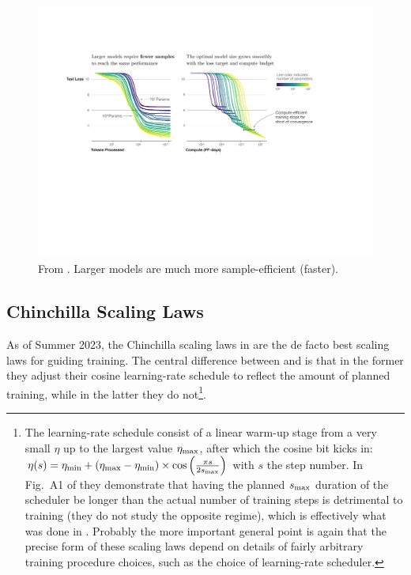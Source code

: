 \documentclass[11pt]{article}
\begin{document}
\begin{figure}[ht]
	\centering
	\includegraphics[scale=.5]{figures/EfficiencyIllustration.pdf}
	\caption{From \cite{kaplan2020scaling}. Larger models are much more sample-efficient (faster).}
	\label{fig_scaling_laws_original_2}
\end{figure}


\subsection{Chinchilla Scaling Laws}

As of Summer 2023, the Chinchilla scaling laws in \cite{hoffmann2022training} are the de facto best
scaling laws for guiding training. The central difference between \cite{hoffmann2022training} and
\cite{kaplan2020scaling} is that in the former they adjust their cosine learning-rate schedule to
reflect the amount of planned training, while in the latter they do not\footnote{The learning-rate
	schedule consist of a linear warm-up stage from a very small $ \eta  $ up to the largest value $ \eta _{ {\rm max} } $, after
	which the cosine bit kicks in: $ \eta (s)= \eta _{ {\rm min} } + \left ( \eta _{ {\rm max} } - \eta  _{ {\rm
				min} } \right ) \times \cos \left (\frac{ \pi s }{ 2 s _{ {\rm max} } }  \right) $ with $ s $ the
	step number. In Fig.~A1 of \cite{hoffmann2022training} they demonstrate that having the planned $ s
			_{ {\rm max} } $ duration of the scheduler be longer than the actual number of training steps is
	detrimental to training (they do not study the opposite regime), which is effectively what was done
	in \cite{kaplan2020scaling}. Probably the more important general point is again that the precise
	form of these scaling laws depend on details of fairly arbitrary training procedure choices, such as
	the choice of learning-rate scheduler.}.
\end{document}
